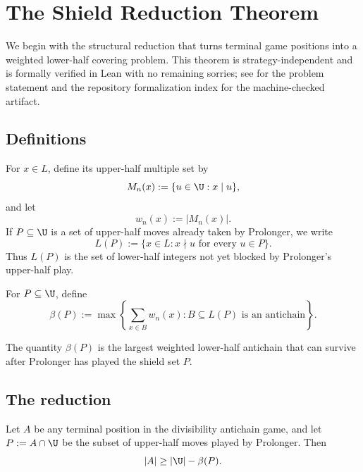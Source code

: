 
\section{The Shield Reduction Theorem}\label{sec:shield-reduction}

We begin with the structural reduction that turns terminal game positions into a
weighted lower-half covering problem.  This theorem is strategy-independent and
is formally verified in Lean with no remaining sorries; see
\cite{Bloom872} for the problem statement and the repository formalization index
for the machine-checked artifact.

\subsection{Definitions}

For $x \in L$, define its upper-half multiple set by
\[
  M_n(x) := \{u \in \U : x \mid u\},
\]
and let
\[
  w_n(x) := |M_n(x)|.
\]
If $P \subseteq \U$ is a set of upper-half moves already taken by Prolonger, we
write
\[
  L(P) := \{x \in L : x \nmid u \text{ for every } u \in P\}.
\]
Thus $L(P)$ is the set of lower-half integers not yet blocked by Prolonger's
upper-half play.

\begin{definition}
For $P \subseteq \U$, define
\[
  \beta(P)
  :=
  \max\left\{
    \sum_{x \in B} w_n(x) :
    B \subseteq L(P) \text{ is an antichain}
  \right\}.
\]
\end{definition}

The quantity $\beta(P)$ is the largest weighted lower-half antichain that can
survive after Prolonger has played the shield set $P$.

\subsection{The reduction}

\begin{theorem}\label{thm:shield-reduction}
Let $A$ be any terminal position in the divisibility antichain game, and let
$P := A \cap \U$ be the subset of upper-half moves played by Prolonger.  Then
\[
  |A| \ge |\U| - \beta(P).
\]
\end{theorem}

